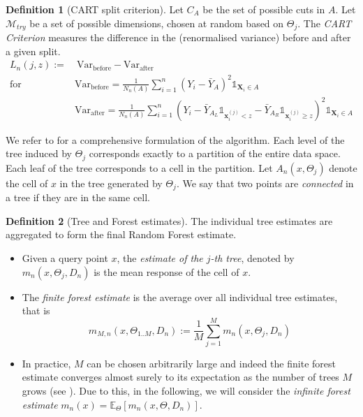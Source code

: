 \documentclass[10pt]{article}
\theoremstyle{definition}
\newtheorem{mydef}{Definition}[section]
\begin{document}
\begin{mydef}[CART split criterion]
  Let $C_{A}$ be the set of possible cuts in $A$. Let $\mathcal{M}_{try}$ be a
  set of possible dimensions, chosen at random based on $\Theta_j$. The
  \textit{CART Criterion} measures the difference in the (renormalised variance)
  before and after a given split.
  \begin{align*}
    L_{n}(j, z) := & ~ \text{Var}_{\text{before}} - \text{Var}_{\text{after}} \\
    \text{for~ ~} &
                    \text{Var}_{\text{before}} = \frac{1}{N_n(A)} \sum_{i=1}^n\left(Y_i-\bar{Y}_A\right)^2 \mathbb{1}_{\mathbf{X}_i \in A}
    \\
                  & \text{Var}_{\text{after}} = \frac{1}{N_n(A)} \sum_{i=1}^n\left(Y_i-\bar{Y}_{A_L} \mathbb{1}_{\mathbf{x}_i^{(j)}<z}-\bar{Y}_{A_R} \mathbb{1}_{\mathbf{x}_i^{(j)} \geq z}\right)^2 \mathbb{1}_{ \mathbf{X}_i \in A}
  \end{align*}
  \label{def:cart-crit}
\end{mydef}

We refer to \cite{biau_RandomForestGuided_2016} for a comprehensive formulation
of the algorithm. Each level of the tree induced by $\Theta_j$ corresponds
exactly to a partition of the entire data space. Each leaf of the tree
corresponds to a cell in the partition. Let $A_n(x, \Theta_j)$ denote the cell
of $x$ in the tree generated by $\Theta_j$. We say that two points
are \textit{connected} in a tree if they are in the same cell.

\begin{mydef}[Tree and Forest estimates] The individual tree estimates are
  aggregated to form the final Random Forest estimate.
  
  \begin{itemize}
  \item Given a query point $x$, the \textit{estimate of the $j$-th tree},
    denoted by $m_{n}(x, \Theta_{j}, D_{n})$ is the mean response of the
    cell of $x$.

    \item The \textit{finite forest estimate} is the average over all individual tree
    estimates, that is $$m_{M, n}(x, \Theta_{1..M}, D_{n}) := \frac{1}{M}
    \sum_{j=1}^M m_{n}(x, \Theta_{j}, D_{n})$$

  \item In practice, $M$ can be chosen arbitrarily large and indeed the finite
    forest estimate converges almost surely to its expectation as the number of
    trees $M$ grows (see \cite{biau_RandomForestGuided_2016}). Due to this, in
    the following, we will consider the \textit{infinite forest estimate}
    $m_{n}(x) = \mathbb{E}_\Theta \left[m_{n}(x, \Theta, D_{n})\right]$.
  \end{itemize}
\end{mydef}
\end{document}
